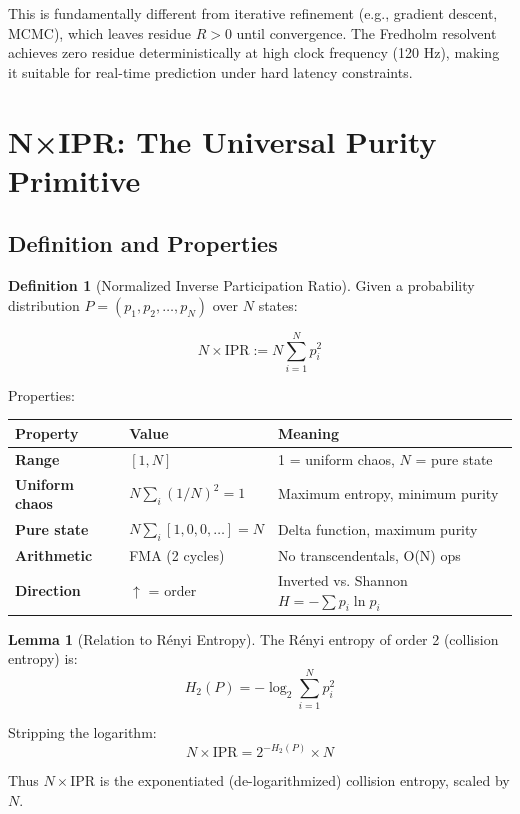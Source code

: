 \documentclass[11pt,oneside]{article}
\theoremstyle{definition}
\newtheorem{lemma}[theorem]{Lemma}
\newtheorem{definition}[theorem]{Definition}
\begin{document}
This is fundamentally different from iterative refinement (e.g., gradient descent, MCMC), which leaves residue $R > 0$ until convergence. The Fredholm resolvent achieves zero residue deterministically at high clock frequency (120 Hz), making it suitable for real-time prediction under hard latency constraints.

\section{N×IPR: The Universal Purity Primitive}

\subsection{Definition and Properties}

\begin{definition}[Normalized Inverse Participation Ratio]
Given a probability distribution $P = (p_1, p_2, \ldots, p_N)$ over $N$ states:

\[
N \times \text{IPR} := N \sum_{i=1}^{N} p_i^2
\]

Properties:
\begin{center}
\begin{tabular}{lll}
\toprule
Property & Value & Meaning \\
\midrule
\textbf{Range} & $[1, N]$ & 1 = uniform chaos, $N$ = pure state \\
\textbf{Uniform chaos} & $N \sum_i (1/N)^2 = 1$ & Maximum entropy, minimum purity \\
\textbf{Pure state} & $N \sum_i [1, 0, 0, \ldots] = N$ & Delta function, maximum purity \\
\textbf{Arithmetic} & FMA (2 cycles) & No transcendentals, O(N) ops \\
\textbf{Direction} & $\uparrow$ = order & Inverted vs. Shannon $H = -\sum p_i \ln p_i$ \\
\bottomrule
\end{tabular}
\end{center}
\end{definition}

\begin{lemma}[Relation to Rényi Entropy]
The Rényi entropy of order 2 (collision entropy) is:
\[
H_2(P) = -\log_2 \sum_{i=1}^N p_i^2
\]

Stripping the logarithm:
\[
N \times \text{IPR} = 2^{-H_2(P)} \times N
\]

Thus $N \times \text{IPR}$ is the exponentiated (de-logarithmized) collision entropy, scaled by $N$.
\end{lemma}
\end{document}

